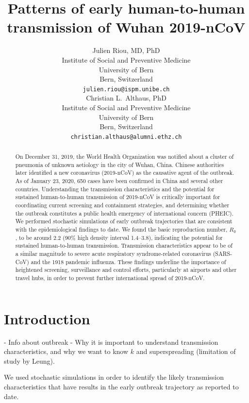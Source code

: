 \documentclass{article}
\title{Patterns of early human-to-human transmission of Wuhan 2019-nCoV}
\author{
   Julien Riou, MD, PhD \\
  Institute of Social and Preventive Medicine\\
  University of Bern\\
  Bern, Switzerland \\
  \texttt{julien.riou@ispm.unibe.ch} \\
  \And
Christian L.~Althaus, PhD \\
Institute of Social and Preventive Medicine\\
University of Bern\\
Bern, Switzerland \\
\texttt{christian.althaus@alumni.ethz.ch}
}
\begin{document}
\maketitle

\begin{abstract}
On December 31, 2019, the World Health Organization was notified about a cluster of pneumonia of unknown aetiology in the city of Wuhan, China. Chinese authorities later identified a new coronavirus (2019-nCoV) as the causative agent of the outbreak. As of January 23, 2020, 650 cases have been confirmed in China and several other countries. Understanding the transmission characteristics and the potential for sustained human-to-human transmission of 2019-nCoV is critically important for coordinating current screening and containment strategies, and determining whether the outbreak constitutes a public health emergency of international concern (PHEIC). We performed stochastic simulations of early outbreak trajectories that are consistent with the epidemiological findings to date. We found the basic reproduction number, $R_0$, to be around 2.2 (90\% high density interval 1.4--3.8), indicating the potential for sustained human-to-human transmission. Transmission characteristics appear to be of a similar magnitude to severe acute respiratory syndrome-related coronavirus (SARS-CoV) and the 1918 pandemic influenza. These findings underline the importance of heightened screening, surveillance and control efforts, particularly at airports and other travel hubs, in order to prevent further international spread of 2019-nCoV.
\end{abstract}

\section{Introduction}

\cite{Shi:2020}

- Info about outbreak
- Why it is important to understand transmission characteristics, and why we want to know $k$ and superspreading (limitation of study by Leung).

We used stochastic simulations in order to identify the likely transmission characteristics that have results in the early outbreak trajectory as reported to date.
\end{document}
